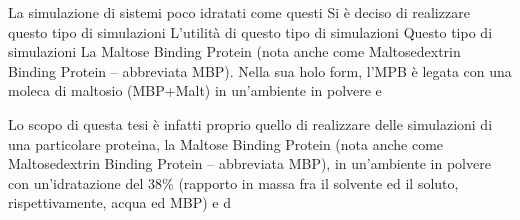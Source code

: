 La simulazione di sistemi poco idratati come questi Si è deciso di realizzare questo tipo di simulazioni L'utilità di questo tipo di simulazioni Questo tipo di simulazioni La Maltose Binding Protein (nota anche come Maltosedextrin Binding Protein -- abbreviata MBP). Nella sua holo form, l'MPB è legata con una moleca di maltosio (MBP+Malt) in un'ambiente in polvere e


Lo scopo di questa tesi è infatti proprio quello di realizzare delle simulazioni di una particolare proteina, la Maltose Binding Protein (nota anche come Maltosedextrin Binding Protein -- abbreviata MBP), in un'ambiente in polvere con un'idratazione del 38\% (rapporto in massa fra il solvente ed il soluto, rispettivamente, acqua ed MBP) e d

